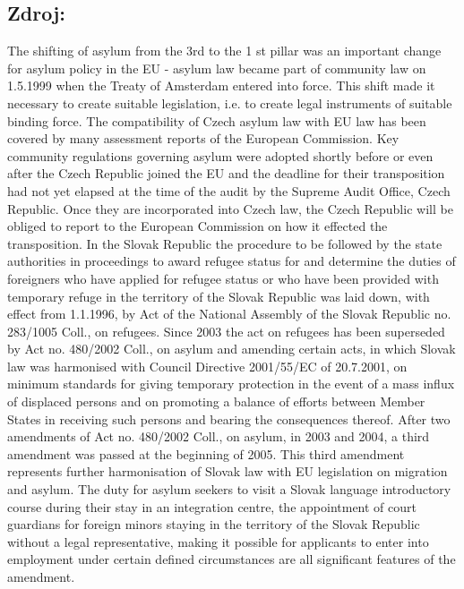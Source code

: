 \documentclass[10pt]{article}
\begin{document}
\subsection*{Zdroj:}

The shifting of asylum from the 3rd to the 1 st pillar was an important change for asylum policy in the EU - asylum law became part of community law on 1.5.1999 when the Treaty of Amsterdam entered into force.
This shift made it necessary to create suitable legislation, i.e. to create legal instruments of suitable binding force.
The compatibility of Czech asylum law with EU law has been covered by many assessment reports of the European Commission.
Key community regulations governing asylum were adopted shortly before or even after the Czech Republic joined the EU and the deadline for their transposition had not yet elapsed at the time of the audit by the Supreme Audit Office, Czech Republic.
Once they are incorporated into Czech law, the Czech Republic will be obliged to report to the European Commission on how it effected the transposition.
In the Slovak Republic the procedure to be followed by the state authorities in proceedings to award refugee status for and determine the duties of foreigners who have applied for refugee status or who have been provided with temporary refuge in the territory of the Slovak Republic was laid down, with effect from 1.1.1996, by Act of the National Assembly of the Slovak Republic no. 283/1005 Coll., on refugees.
Since 2003 the act on refugees has been superseded by Act no. 480/2002 Coll., on asylum and amending certain acts, in which Slovak law was harmonised with Council Directive 2001/55/EC of 20.7.2001, on minimum standards for giving temporary protection in the event of a mass influx of displaced persons and on promoting a balance of efforts between Member States in receiving such persons and bearing the consequences thereof.
After two amendments of Act no. 480/2002 Coll., on asylum, in 2003 and 2004, a third amendment was passed at the beginning of 2005. This third amendment represents further harmonisation of Slovak law with EU legislation on migration and asylum.
The duty for asylum seekers to visit a Slovak language introductory course during their stay in an integration centre, the appointment of court guardians for foreign minors staying in the territory of the Slovak Republic without a legal representative, making it possible for applicants to enter into employment under certain defined circumstances are all significant features of the amendment.


\pagebreak
\end{document}
